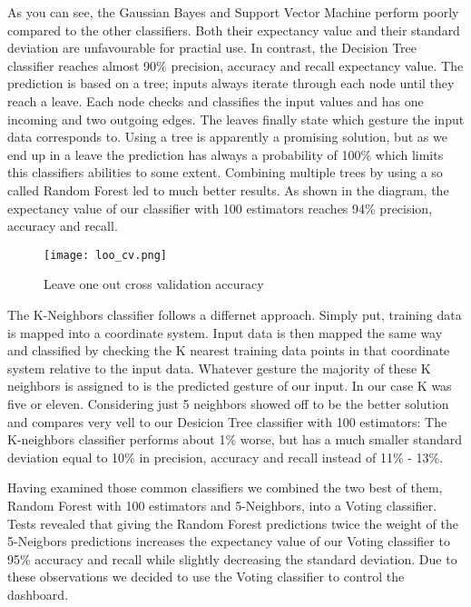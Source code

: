 As you can see, the Gaussian Bayes and Support Vector Machine perform poorly compared to the other classifiers. Both their expectancy value and their standard deviation are unfavourable for practial use. In contrast, the Decision Tree classifier reaches almost 90\% precision, accuracy and recall expectancy value. The prediction is based on a tree; inputs always iterate through each node until they reach a leave. Each node checks and classifies the input values and has one incoming and two outgoing edges. The leaves finally state which gesture the input data corresponds to. Using a tree is apparently a promising solution, but as we end up in a leave the prediction has always a probability of 100\% which limits this classifiers abilities to some extent. Combining multiple trees by using a so called Random Forest led to much better results. As shown in the diagram, the expectancy value of our classifier with 100 estimators reaches 94\% precision, accuracy and recall. 

\begin{wrapfigure}{R}{0.4\textwidth}
\centering
\texttt{[image: loo\_cv.png]}
\caption{Leave one out cross validation accuracy}\label{fig:loo}
\end{wrapfigure}

The K-Neighbors classifier follows a differnet approach. Simply put, training data is mapped into a coordinate system. Input data is then mapped the same way and classified by checking the K nearest training data points in that coordinate system relative to the input data. Whatever gesture the majority of these K neighbors is assigned to is the predicted gesture of our input. In our case K was five or eleven. Considering just 5 neighbors showed off to be the better solution and compares very vell to our Desicion Tree classifier with 100 estimators: The K-neighbors classifier performs about 1\% worse, but has a much smaller standard deviation equal to 10\% in precision, accuracy and recall instead of 11\% - 13\%.

Having examined those common classifiers we combined the two best of them, Random Forest with 100 estimators and 5-Neighbors, into a Voting classifier. Tests revealed that giving the Random Forest predictions twice the weight of the 5-Neigbors predictions increases the expectancy value of our Voting classifier to 95\% accuracy and recall while slightly decreasing the standard deviation. Due to these observations we decided to use the Voting classifier to control the dashboard.

